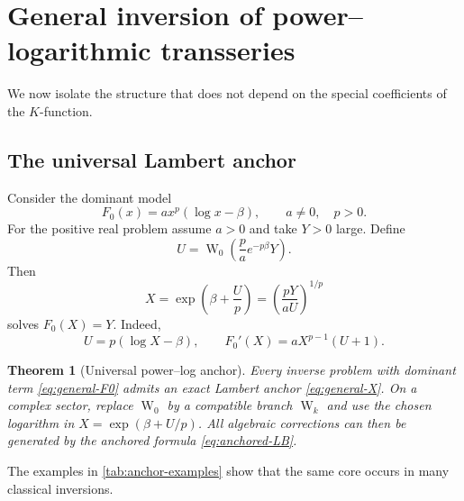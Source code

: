 \documentclass[11pt,oneside]{article}
\theoremstyle{plain}
\newtheorem{theorem}{Theorem}[section]
\theoremstyle{definition}
\theoremstyle{remark}
\newcommand{\W}{\operatorname{W}}
\begin{document}
\section{General inversion of power--logarithmic transseries}
\label{sec:general-theory}

We now isolate the structure that does not depend on the special coefficients
of the \(K\)-function.

\subsection{The universal Lambert anchor}

Consider the dominant model
\begin{equation}
 F_0(x)=a x^p(\log x-\beta),
 \qquad a\ne0,\quad p>0.
 \label{eq:general-F0}
\end{equation}
For the positive real problem assume \(a>0\) and take \(Y>0\) large.  Define
\begin{equation}
 U=\W_0\!\left(\frac{p}{a}e^{-p\beta}Y\right).
 \label{eq:general-U}
\end{equation}
Then
\begin{equation}
 X=\exp\!\left(\beta+\frac{U}{p}\right)
 =\left(\frac{pY}{aU}\right)^{1/p}
 \label{eq:general-X}
\end{equation}
solves \(F_0(X)=Y\).  Indeed,
\begin{equation}
 U=p(\log X-\beta),
 \qquad
 F_0'(X)=aX^{p-1}(U+1).
 \label{eq:general-anchor-identities}
\end{equation}

\begin{theorem}[Universal power--log anchor]
\label{thm:universal-anchor}
Every inverse problem with dominant term \eqref{eq:general-F0} admits an exact
Lambert anchor \eqref{eq:general-X}.  On a complex sector, replace \(\W_0\) by
a compatible branch \(\W_k\) and use the chosen logarithm in
\(X=\exp(\beta+U/p)\).  All algebraic corrections can then be generated by the
anchored formula \eqref{eq:anchored-LB}.
\end{theorem}

The examples in \cref{tab:anchor-examples} show that the same core occurs in
many classical inversions.
\end{document}
